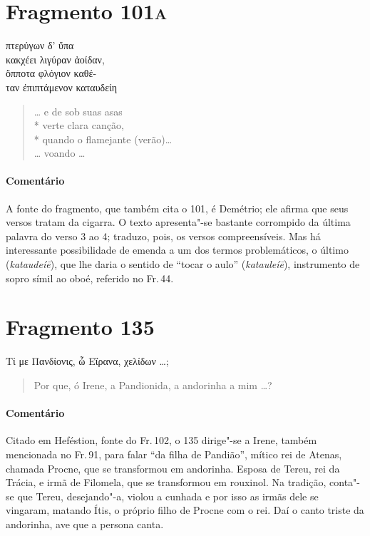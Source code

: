\section{Fragmento 101\textsc{a}}

\begin{gkverse}
πτερύγων δ’ ὔπα\\
κακχέει λιγύραν ἀοίδαν,\\
ὄπποτα φλόγιον \dagger{}καθέ-\\
ταν\dagger{} ἐπιπτάμενον \dagger{}καταυδείη\dagger{}
\end{gkverse}

\begin{verse}
\ldots{} e de sob suas asas\\*
verte clara canção,\\*
quando o flamejante (verão)\ldots{}\\
\ldots{} voando \ldots{}
\end{verse}

{\paragraph{Comentário} A fonte do fragmento, que também cita o 101, é Demétrio; ele afirma que seus versos tratam da cigarra. O texto apresenta"-se bastante corrompido da última palavra do verso 3 ao 4; traduzo, pois, os versos compreensíveis. Mas há interessante possibilidade de emenda a um dos termos problemáticos, o último (\textit{kataudeíē}), que lhe daria o sentido de ``tocar o aulo'' (\textit{katauleíē}), instrumento de sopro símil ao oboé, referido no Fr.\,44.}



\pagebreak
\section{Fragmento 135}

\begin{gkverse}
Τί με Πανδίονις, ὦ Εἴρανα, χελίδων \ldots{};
\end{gkverse}

\begin{verse}
Por que, ó Irene, a Pandionida, a andorinha a mim \ldots{}?
\end{verse}

{\paragraph{Comentário} Citado em Heféstion, fonte do Fr.\,102, o 135 dirige"-se a Irene, também mencionada no Fr.\,91, para falar ``da filha de Pandião'', mítico rei de Atenas, chamada Procne, que se transformou em andorinha. Esposa de Tereu, rei da Trácia, e irmã de Filomela, que se transformou em rouxinol. Na tradição, conta"-se que Tereu, desejando"-a, violou a cunhada e por isso as irmãs dele se vingaram, matando Ítis, o próprio filho de Procne com o rei. Daí o canto triste da andorinha, ave que a persona canta.}


